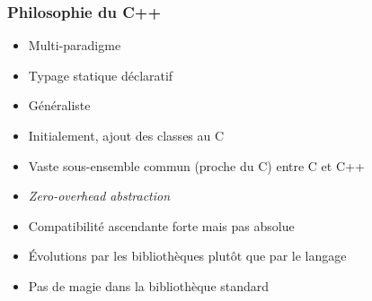 \documentclass[C++.tex]{subfiles}
\begin{document}
\begin{frame}[fragile]
	\frametitle{Philosophie du C++}
	\begin{itemize}
		\item Multi-paradigme


		\item Typage statique déclaratif
		\item Généraliste
		\item Initialement, ajout des classes au C
		\item Vaste sous-ensemble commun (proche du C) entre C et C++
		\item \textit{Zero-overhead abstraction}
		\item Compatibilité ascendante forte mais pas absolue
		\item Évolutions par les bibliothèques plutôt que par le langage
		\item Pas de \og magie\fg{} dans la bibliothèque standard
	\end{itemize}
\end{frame}
\end{document}
